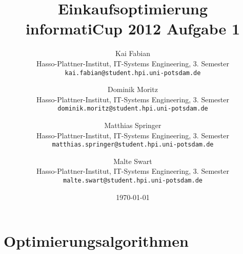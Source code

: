 \documentclass[oneside,12pt,a4paper]{scrartcl}
\begin{document}
\begin{titlepage}
\author{Kai Fabian\\Hasso-Plattner-Institut, IT-Systems Engineering, 3. Semester\\\texttt{kai.fabian@student.hpi.uni-potsdam.de} 
\and Dominik Moritz\\Hasso-Plattner-Institut, IT-Systems Engineering, 3. Semester\\\texttt{dominik.moritz@student.hpi.uni-potsdam.de}
\and Matthias Springer\\Hasso-Plattner-Institut, IT-Systems Engineering, 3. Semester\\\texttt{matthias.springer@student.hpi.uni-potsdam.de}
\and Malte Swart\\Hasso-Plattner-Institut, IT-Systems Engineering, 3. Semester \\\texttt{malte.swart@student.hpi.uni-potsdam.de}}


\title{Einkaufsoptimierung\\informatiCup 2012 Aufgabe 1}

\date{\today}
\maketitle
\end{titlepage}
\pagestyle{fancy}
\tableofcontents




\section{Optimierungsalgorithmen}


\end{document}
